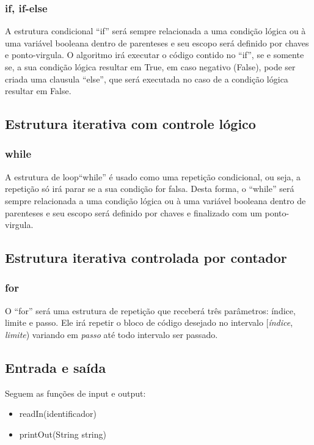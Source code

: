 \documentclass[a4paper, 12pt, article]{memoir}
\begin{document}
\subsubsection{if, if-else}
\label{subsubsec:if}
A estrutura condicional ``if'' será sempre relacionada a uma condição lógica ou à uma variável booleana dentro de
parenteses e seu escopo será definido por chaves e ponto-virgula. O algoritmo irá executar o código contido no ``if'', se e somente se, a sua condição lógica resultar em True, em caso negativo (False), pode ser criada uma clausula ``else'', que será executada no caso de a condição lógica resultar em False.

\subsection{Estrutura iterativa com controle lógico}
\label{subsec:iterativalogico}

\subsubsection{while}
\label{subsubsec:while}
A estrutura de loop``while'' é usado como uma repetição condicional, ou seja, a repetição só irá
parar se a sua condição for falsa. Desta forma, o ``while'' será sempre relacionada a uma condição lógica ou à uma variável booleana dentro de parenteses e seu escopo será definido por chaves e finalizado com um ponto-virgula.


\subsection{Estrutura iterativa controlada por contador}
\label{subsec:iterativacontador}

\subsubsection{for}
\label{subsubsec:for}
O ``for'' será uma estrutura de repetição que receberá três parâmetros: índice,
limite e passo. Ele irá repetir o bloco de código desejado no intervalo
[\emph{índice}, \emph{limite}) variando em \emph{passo} até todo intervalo
ser passado.

\subsection{Entrada e saída}
\label{subsec:io}
Seguem as funções de input e output:

\begin{itemize}
\item readIn(identificador)
\item printOut(String string)

\end{itemize}
\end{document}
